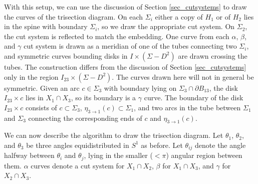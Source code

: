 \documentclass[12pt]{amsart}
\newcommand{\del}{\partial }
\theoremstyle{definition}
\theoremstyle{remark}
\begin{document}
With this setup, we can use the discussion of Section \ref{sec_cutsystems} to draw the curves of the trisection diagram.
On each $\Sigma_i$ either a copy of $H_1$ or of $H_2$ lies in the spine with boundary $\Sigma_i$, so we draw the appropriate cut system.
On $\Sigma_2$, the cut system is reflected to match the embedding.
One curve from each $\alpha$, $\beta$, and $\gamma$ cut system is drawn as a meridian of one of the tubes connecting two $\Sigma_i$, and symmetric curves bounding disks in $I \times (\Sigma - D^2)$ are drawn crossing the tubes.
The construction differs from the discussion of Section \ref{sec_cutsystems} only in the region $I_{23} \times (\Sigma - D^2)$.
The curves drawn here will not in general be symmetric.
Given an arc $c \in \Sigma_3$ with boundary lying on $\Sigma_3 \cap \del B_{13}$, the disk $I_{23} \times c$ lies in $X_1 \cap X_3$, so its boundary is a $\gamma$ curve.
The boundary of the disk $I_{23} \times c$ consists of $c \subset \Sigma_3$, $\eta_{3 \to 1}(c) \subset \Sigma_1$, and two arcs in the tube between $\Sigma_1$ and $\Sigma_3$ connecting the corresponding ends of $c$ and $\eta_{3 \to 1}(c)$.


We can now describe the algorithm to draw the trisection diagram.
Let $\theta_1$, $\theta_2$, and $\theta_3$ be three angles equidistributed in $S^1$ as before.
Let $\theta_{ij}$ denote the angle halfway between $\theta_i$ and $\theta_j$, lying in the smaller ($<\pi$) angular region between them.
$\alpha$ curves denote a cut system for $X_1 \cap X_2$, $\beta$ for $X_1 \cap X_3$, and $\gamma$ for $X_2 \cap X_3$.
\end{document}
